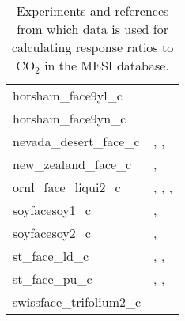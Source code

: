 \begin{table}[ht]
\begin{tabular}{p{5cm}p{7cm}}
  horsham\_face9yl\_c & \cite{tausz-posch_et_al_2013a}   \\
  horsham\_face9yn\_c & \cite{tausz-posch_et_al_2013a}   \\
  nevada\_desert\_face\_c & \cite{aranjuelo_et_al_2011}, \cite{hamerlynck_et_al_2000}, \cite{huxman_and_smith_2001}   \\
  new\_zealand\_face\_c & \cite{guo_et_al_2006}, \cite{von_caemmerer_et_al_2001}   \\
  ornl\_face\_liqui2\_c & \cite{gunderson_et_al_2002}, \cite{monson_et_al_2007}, \cite{sholtis_et_al_2004}, \cite{warren_et_al_2015}   \\
  soyfacesoy1\_c & \cite{bernacchi_et_al_2005}, \cite{dermody_et_al_2006}   \\
  soyfacesoy2\_c & \cite{bernacchi_et_al_2005}, \cite{dermody_et_al_2006}   \\
  st\_face\_ld\_c & \cite{handa_et_al_2005}, \cite{haettenschwiler_et_al_2002}, \cite{dawes_et_al_2013}   \\
  st\_face\_pu\_c & \cite{dawes_et_al_2013}, \cite{handa_et_al_2005}, \cite{haettenschwiler_et_al_2002}   \\
  swissface\_trifolium2\_c & \cite{ainsworth_et_al_2003}   \\
  \end{tabular}
\caption{Experiments and references from which data is used for calculating response ratios to CO$_2$ in the MESI database.} 
\end{table}
